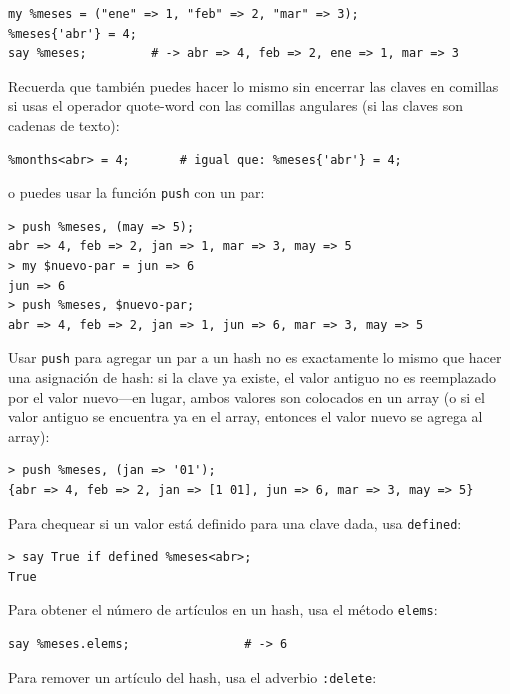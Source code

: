 \begin{verbatim}
my %meses = ("ene" => 1, "feb" => 2, "mar" => 3);
%meses{'abr'} = 4;
say %meses;         # -> abr => 4, feb => 2, ene => 1, mar => 3
\end{verbatim}

Recuerda que también puedes hacer lo mismo sin encerrar 
las claves en comillas si usas el operador quote-word con
las comillas angulares (si las claves son cadenas de texto):

\begin{verbatim}
%months<abr> = 4;       # igual que: %meses{'abr'} = 4;
\end{verbatim}

o puedes usar la función {\tt push} con un par:

\begin{verbatim}
> push %meses, (may => 5);
abr => 4, feb => 2, jan => 1, mar => 3, may => 5
> my $nuevo-par = jun => 6
jun => 6
> push %meses, $nuevo-par;
abr => 4, feb => 2, jan => 1, jun => 6, mar => 3, may => 5
\end{verbatim}
%

Usar {\tt push} para agregar un par a un hash no es exactamente lo
mismo que hacer una asignación de hash: si la clave ya existe,
el valor antiguo no es reemplazado por el valor nuevo---en lugar,
ambos valores son colocados en un array (o si el valor antiguo se 
encuentra ya en el array, entonces el valor nuevo se agrega al 
array):

\begin{verbatim}
> push %meses, (jan => '01');
{abr => 4, feb => 2, jan => [1 01], jun => 6, mar => 3, may => 5}
\end{verbatim}

Para chequear si un valor está definido para una clave dada,
usa {\tt defined}:

\begin{verbatim}
> say True if defined %meses<abr>;
True
\end{verbatim}
%

Para obtener el número de artículos en un hash, usa el 
método {\tt elems}:

\begin{verbatim}
say %meses.elems;                # -> 6
\end{verbatim}

Para remover un artículo del hash, usa el adverbio {\tt :delete}:

